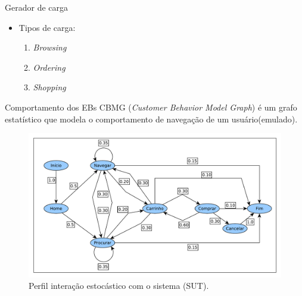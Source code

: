 \begin{frame}{Gerador de carga}
\begin{itemize}
\item Tipos de carga:
\begin{enumerate}
	\item \textit{Browsing}
	\item \textit{Ordering}
	\item \textit{Shopping}
\end{enumerate}
\end{itemize}  


\end{frame}

\begin{frame}{Comportamento dos EBs}
CBMG (\textit{Customer Behavior Model Graph}) é um grafo estatístico que modela o comportamento de navegação de um usuário(emulado).

	\begin{figure}
		\center
		\includegraphics[scale=0.35]{images/CBMG}
		\caption{Perfil interação estocástico com o sistema (SUT).}
		\label{fig:CBMG}
	\end{figure}
\end{frame}

